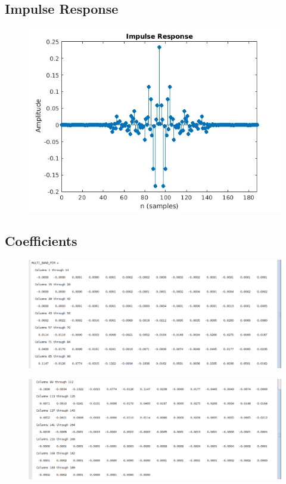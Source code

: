 \documentclass{article}
\begin{document}
\subsection{Impulse Response}
\begin{figure}[H]
\hspace*{-2.5cm}
    \centering
    \includegraphics[width=1.5\linewidth, height=0.6\textheight]{IR_multiband.jpg}
    \label{fig:my_label}
\end{figure}

\subsection{Coefficients}
\begin{figure}[H]
\hspace*{-2.5cm}
    \centering
    \includegraphics[width=1.5\linewidth, height=0.55\textheight]{multiband1.png}
    \label{fig:my_label}
\end{figure}

\begin{figure}[H]
    \hspace*{-2.5cm}
        \centering
        \includegraphics[width=1.5\linewidth, height=0.55\textheight]{multiband2.png}
        \label{fig:my_label}
    \end{figure}
\end{document}
